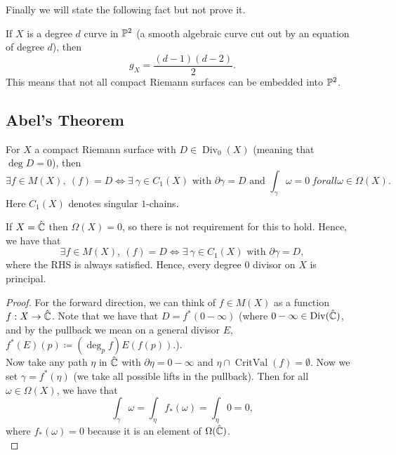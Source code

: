 \documentclass{article}
\begin{document}
{Finally we will state the following fact but not prove it.
\begin{definition}
    If $X$ is a degree $d$ curve in $\mathbb{P}^2$ (a smooth algebraic curve cut out by an equation of degree $d$), then
    \[g_X = \frac{(d-1)(d-2)}{2}.\]
    This means that not all compact Riemann surfaces can be embedded into $\mathbb{P}^2$.
\end{definition}

\subsection{Abel's Theorem}

\begin{theorem}
    For $X$ a compact Riemann surface with $D \in \operatorname{Div}_0(X)$ (meaning that $\deg D = 0$), then
    \[\exists f \in M(X),\ (f) = D \iff \exists\ \gamma \in C_1(X) \text{ with } \partial \gamma = D \text{ and } \int_\gamma \omega = 0\ forall \omega \in \Omega(X). \]
    Here $C_1(X)$ denotes singular $1$-chains.
\end{theorem}

\begin{remark}
    If $X = \hat{\mathbb{C}}$ then $\Omega(X) = 0$, so there is not requirement for this to hold. Hence, we have that
    \[\exists f \in M(X),\ (f) = D \iff  \exists\ \gamma \in C_1(X) \text{ with } \partial \gamma = D,\]
    where the RHS is always satisfied. Hence, every degree $0$ divisor on $X$ is principal.
\end{remark}

\begin{proof}
    For the forward direction, we can think of $f \in M(X)$ as a function $f: X \to \hat{\mathbb{C}}$. Note that we have that $D = f^*(0 - \infty)$ (where $0 - \infty \in \operatorname{Div}(\hat{\mathbb{C}})$, and by the pullback we mean on a general divisor $E$,  $f^*(E)(p) \coloneqq (\deg_p f) E(f(p))$.).\\

    Now take any path $\eta$ in $\hat{\mathbb{C}}$ with $\partial \eta = 0 - \infty$ and $\eta \cap \operatorname{CritVal}(f) = \emptyset$. Now we set $\gamma = f^*(\eta)$ (we take all possible lifts in the pullback). Then for all $\omega \in \Omega(X)$, we have that
    \[\int_\gamma \omega = \int_{\eta} f_*(\omega) = \int_\eta 0 = 0,\]
    where $f_*(\omega) = 0$ because it is an element of $\Omega(\hat{\mathbb{C}})$.\\


\end{proof}}
\end{document}
